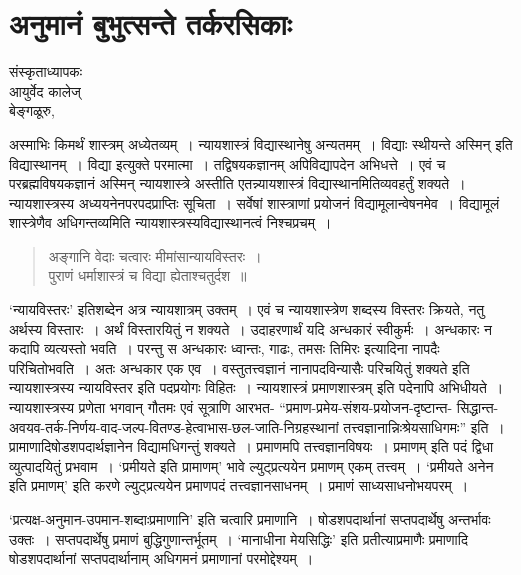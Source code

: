 {\fontsize{15}{17}\selectfont
\chapter{अनुमानं बुभुत्सन्ते  तर्करसिकाः}

\begin{center}
\smallskip
संस्कृताध्यापकः\\
आयुर्वेद कालेज्\\ 
बेङ्गळूरु,
\addrule
\end{center}

अस्माभिः किमर्थं शास्त्रम् अध्येतव्यम्~। न्यायशास्त्रं विद्यास्थानेषु अन्यतमम्~। विद्याः स्थीयन्ते अस्मिन् इति विद्यास्थानम्~। विद्या इत्युक्ते परमात्मा~। तद्विषयकज्ञानम् अपिविद्यापदेन अभिधत्ते~। एवं च परब्रह्मविषयकज्ञानं अस्मिन् न्यायशास्त्रे अस्तीति एतन्न्यायशास्त्रं विद्यास्थानमितिव्यवहर्तुं शक्यते~। न्यायशास्त्रस्य अध्ययनेनपरपदप्राप्तिः सूचिता~। सर्वेषां शास्त्राणां प्रयोजनं विद्यामूलान्वेषनमेव~। विद्यामूलं शास्त्रेणैव अधिगन्तव्यमिति न्यायशास्त्रस्यविद्यास्थानत्वं निश्चप्रचम्~। 
\begin{verse}
अङ्गानि वेदाः चत्वारः मीमांसान्यायविस्तरः~। \\
पुराणं धर्माशास्त्रं च विद्या ह्येताश्चतुर्दश~॥
\end{verse}
‘न्यायविस्तरः’ इतिशब्देन अत्र न्यायशात्रम् उक्तम्~। एवं च न्यायशास्त्रेण शब्दस्य विस्तरः क्रियते, नतु अर्थस्य विस्तारः~। अर्थं विस्तारयितुं न शक्यते~। उदाहरणार्थं यदि अन्धकारं स्वीकुर्मः~। अन्धकारः न कदापि व्यत्यस्तो भवति~। परन्तु स अन्धकारः ध्वान्तः, गाढः, तमसः तिमिरः इत्यादिना नापदैः परिचितोभवति~। अतः अन्धकार एक एव~। वस्तुतत्त्वज्ञानं नानापदविन्यासैः परिचयितुं शक्यते इति न्यायशास्त्रस्य न्यायविस्तर इति पदप्रयोगः विहितः~। न्यायशास्त्रं प्रमाणशास्त्रम् इति पदेनापि अभिधीयते~।  न्यायशास्त्रस्य प्रणेता भगवान् गौतमः एवं सूत्राणि आरभत- “प्रमाण-प्रमेय-संशय-प्रयोजन-दृष्टान्त- सिद्धान्त-अवयव-तर्क-निर्णय-वाद-जल्प-वितण्ड-हेत्वाभास-छल-जाति-निग्रहस्थानां तत्त्वज्ञानान्निःश्रेयसाधिगमः” इति~। प्रामाणादिषोडशपदार्थज्ञानेन विद्यामधिगन्तुं शक्यते~। प्रमाणमपि तत्त्वज्ञानविषयः~। प्रमाणम् इति पदं द्विधा व्युत्पादयितुं प्रभवाम~। ‘प्रमीयते इति प्रामाणम्’ भावे ल्युट्प्रत्ययेन प्रमाणम् एकम् तत्त्वम्~। ‘प्रमीयते अनेन इति प्रमाणम्’ इति करणे ल्युट्प्रत्ययेन प्रमाणपदं तत्त्वज्ञानसाधनम्~। प्रमाणं साध्यसाधनोभयपरम्~। 

‘प्रत्यक्ष-अनुमान-उपमान-शब्दाःप्रमाणानि’ इति चत्वारि प्रमाणानि~। षोडशपदार्थानां सप्तपदार्थेषु अन्तर्भावः उक्तः~। सप्तपदार्थेषु प्रमाणं बुद्धिगुणान्तर्भूतम्~। ‘मानाधीना मेयसिद्धिः’ इति प्रतीत्याप्रमाणैः प्रमाणादि षोडशपदार्थानां सप्तपदार्थानाम् अधिगमनं प्रमाणानां परमोद्देश्यम्~। 

}
